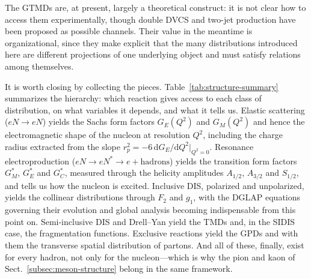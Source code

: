 The GTMDs are, at present, largely a theoretical construct: it is not clear how to access
them experimentally, though double DVCS and two-jet production have been proposed as
possible channels. Their value in the meantime is organizational, since they make explicit
that the many distributions introduced here are different projections of one underlying
object and must satisfy relations among themselves.

It is worth closing by collecting the pieces. Table~\ref{tab:structure-summary}
summarizes the hierarchy: which reaction gives access to each class of distribution, on
what variables it depends, and what it tells us. Elastic scattering
($eN\to eN$) yields the Sachs form factors $G_{E}(Q^{2})$ and $G_{M}(Q^{2})$ and hence the
electromagnetic shape of the nucleon at resolution $Q^{2}$, including the charge radius
extracted from the slope $r_{p}^{2}=-6\,\mathrm{d}G_{E}/\mathrm{d}Q^{2}|_{Q^{2}=0}$.
Resonance electroproduction ($eN\to eN^{*}\to e+\mathrm{hadrons}$) yields the transition
form factors $G_{M}^{*}$, $G_{E}^{*}$ and $G_{C}^{*}$, measured through the helicity
amplitudes $A_{1/2}$, $A_{3/2}$ and $S_{1/2}$, and tells us how the nucleon is excited.
Inclusive DIS, polarized and unpolarized, yields the collinear distributions through
$F_{2}$ and $g_{1}$, with the DGLAP equations governing their evolution and global
analysis becoming indispensable from this point on. Semi-inclusive DIS and Drell--Yan
yield the TMDs and, in the SIDIS case, the fragmentation functions. Exclusive reactions
yield the GPDs and with them the transverse spatial distribution of partons. And all of
these, finally, exist for every hadron, not only for the nucleon---which is why the
pion and kaon of Sect.~\ref{subsec:meson-structure} belong in the same framework.


